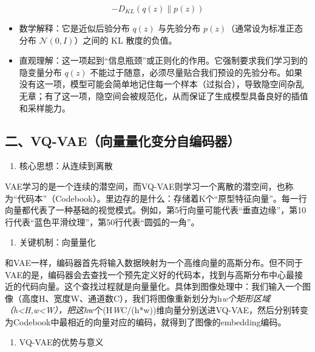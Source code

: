 \[
- D_{KL}(q(z)\parallel p(z))
\]

\begin{itemize}
\tightlist
\item
  数学解释：它是近似后验分布 \(q(z)\) 与先验分布 \(p(z)\)（通常设为标准正态分布 \(\mathcal{N}(0, I)\)）之间的 KL 散度的负值。
\item
  直观理解：这一项起到``信息瓶颈''或正则化的作用。它强制要求我们学习到的隐变量分布 \(q(z)\) 不能过于随意，必须尽量贴合我们预设的先验分布。如果没有这一项，模型可能会简单地记住每一个样本（过拟合），导致隐空间杂乱无章；有了这一项，隐空间会被规范化，从而保证了生成模型具备良好的插值和采样能力。
\end{itemize}

\hypertarget{ux4e8cvq-vaeux5411ux91cfux91cfux5316ux53d8ux5206ux81eaux7f16ux7801ux5668}{%
\subsection{二、VQ-VAE（向量量化变分自编码器）}\label{ux4e8cvq-vaeux5411ux91cfux91cfux5316ux53d8ux5206ux81eaux7f16ux7801ux5668}}

\begin{enumerate}
\def\labelenumi{\arabic{enumi}.}
\tightlist
\item
  核心思想：从连续到离散
\end{enumerate}

VAE学习的是一个连续的潜空间，而VQ-VAE则学习一个离散的潜空间，也称为``代码本''（Codebook）。里边存的是什么：存储着K个``原型特征向量''。每一行向量都代表了一种基础的视觉模式。例如，第5行向量可能代表``垂直边缘''，第10行代表``蓝色平滑纹理''，第50行代表``圆弧的一角''。

\begin{enumerate}
\def\labelenumi{\arabic{enumi}.}
\setcounter{enumi}{1}
\tightlist
\item
  关键机制：向量量化
\end{enumerate}

和VAE一样，编码器首先将输入数据映射为一个高维向量的高斯分布。但不同于VAE的是，编码器会去查找一个预先定义好的代码本，找到与高斯分布中心最接近的代码向量。这个查找过程就是向量量化。具体到图像处理中：我们输入一个图像（高度H、宽度W、通道数C），我们将图像重新划分为h\emph{w个矩形区域（h\textless H,w\textless W），把这h}w个(H\emph{W}C/(h*w))维向量分别送进VQ-VAE，然后分别转变为Codebook中最相近的向量对应的编码，就得到了图像的embedding编码。

\begin{enumerate}
\def\labelenumi{\arabic{enumi}.}
\setcounter{enumi}{2}
\tightlist
\item
  VQ-VAE的优势与意义
\end{enumerate}

